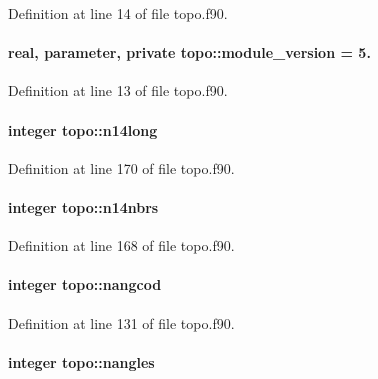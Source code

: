 Definition at line 14 of file topo.\-f90.

\hypertarget{classtopo_a4f6210fac33536607cb33d0af2b86205}{
\paragraph[{module\-\_\-version}]{\setlength{\rightskip}{0pt plus 5cm}real, parameter, private topo\-::module\-\_\-version = 5.\hspace{0.3cm}{\ttfamily [private]}}}\label{classtopo_a4f6210fac33536607cb33d0af2b86205}


Definition at line 13 of file topo.\-f90.

\hypertarget{classtopo_a7a7341812bbcb4ee7fb15e2bcbe7c7ab}{
\paragraph[{n14long}]{\setlength{\rightskip}{0pt plus 5cm}integer topo\-::n14long}}\label{classtopo_a7a7341812bbcb4ee7fb15e2bcbe7c7ab}


Definition at line 170 of file topo.\-f90.

\hypertarget{classtopo_a6debae2aa4d0f73038d45c4d4baecd06}{
\paragraph[{n14nbrs}]{\setlength{\rightskip}{0pt plus 5cm}integer topo\-::n14nbrs}}\label{classtopo_a6debae2aa4d0f73038d45c4d4baecd06}


Definition at line 168 of file topo.\-f90.

\hypertarget{classtopo_a436580317d68710fbbcccd1ee7440194}{
\paragraph[{nangcod}]{\setlength{\rightskip}{0pt plus 5cm}integer topo\-::nangcod}}\label{classtopo_a436580317d68710fbbcccd1ee7440194}


Definition at line 131 of file topo.\-f90.

\hypertarget{classtopo_acb9de4b76e3e1615bb6f05ca40c22c61}{
\paragraph[{nangles}]{\setlength{\rightskip}{0pt plus 5cm}integer topo\-::nangles}}\label{classtopo_acb9de4b76e3e1615bb6f05ca40c22c61}


